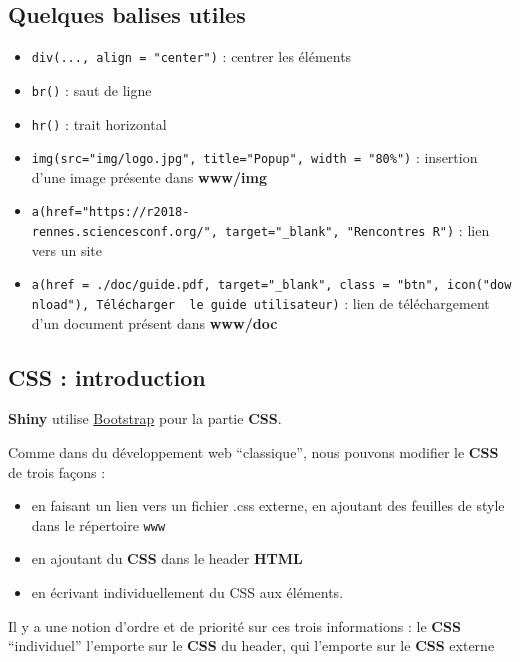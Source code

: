 \documentclass[
]{article}
\providecommand{\tightlist}{%
  \setlength{\itemsep}{0pt}\setlength{\parskip}{0pt}}
\begin{document}
\hypertarget{quelques-balises-utiles}{%
\subsection{Quelques balises utiles}\label{quelques-balises-utiles}}

\begin{itemize}
\tightlist
\item
  \texttt{div(...,\ align\ =\ "center")} : centrer les éléments
\item
  \texttt{br()} : saut de ligne
\item
  \texttt{hr()} : trait horizontal
\item
  \texttt{img(src="img/logo.jpg",\ title="Popup",\ width\ =\ "80\%")} :
  insertion d'une image présente dans \textbf{www/img}
\item
  \texttt{a(href="https://r2018-rennes.sciencesconf.org/",\ target="\_blank",\ "Rencontres\ R")}
  : lien vers un site
\item
  \texttt{a(href\ =\ \textquotesingle{}./doc/guide.pdf\textquotesingle{},\ target="\_blank",\ class\ =\ "btn",\ icon("download"),\ \textquotesingle{}Télécharger\ \ le\ guide\ utilisateur\textquotesingle{})}
  : lien de téléchargement d'un document présent dans \textbf{www/doc}
\end{itemize}

\hypertarget{css-introduction}{%
\subsection{CSS : introduction}\label{css-introduction}}

\textbf{Shiny} utilise \href{http://getbootstrap.com/}{Bootstrap} pour
la partie \textbf{CSS}.

Comme dans du développement web ``classique'', nous pouvons modifier le
\textbf{CSS} de trois façons :

\begin{itemize}
\tightlist
\item
  en faisant un lien vers un fichier .css externe, en ajoutant des
  feuilles de style dans le répertoire \texttt{www}
\item
  en ajoutant du \textbf{CSS} dans le header \textbf{HTML}
\item
  en écrivant individuellement du CSS aux éléments.
\end{itemize}

Il y a une notion d'ordre et de priorité sur ces trois informations : le
\textbf{CSS} ``individuel'' l'emporte sur le \textbf{CSS} du header, qui
l'emporte sur le \textbf{CSS} externe
\end{document}
